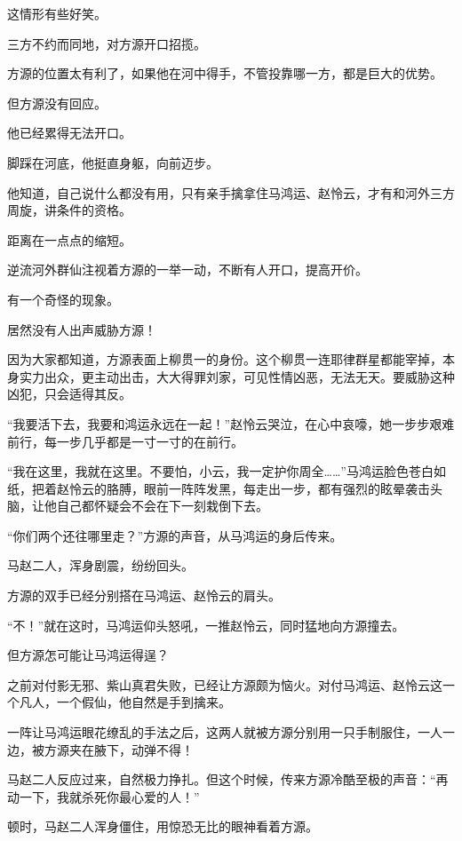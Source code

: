 
\begin{this_body}

这情形有些好笑。

三方不约而同地，对方源开口招揽。

方源的位置太有利了，如果他在河中得手，不管投靠哪一方，都是巨大的优势。

但方源没有回应。

他已经累得无法开口。

脚踩在河底，他挺直身躯，向前迈步。

他知道，自己说什么都没有用，只有亲手擒拿住马鸿运、赵怜云，才有和河外三方周旋，讲条件的资格。

距离在一点点的缩短。

逆流河外群仙注视着方源的一举一动，不断有人开口，提高开价。

有一个奇怪的现象。

居然没有人出声威胁方源！

因为大家都知道，方源表面上柳贯一的身份。这个柳贯一连耶律群星都能宰掉，本身实力出众，更主动出击，大大得罪刘家，可见性情凶恶，无法无天。要威胁这种凶犯，只会适得其反。

“我要活下去，我要和鸿运永远在一起！”赵怜云哭泣，在心中哀嚎，她一步步艰难前行，每一步几乎都是一寸一寸的在前行。

“我在这里，我就在这里。不要怕，小云，我一定护你周全……”马鸿运脸色苍白如纸，把着赵怜云的胳膊，眼前一阵阵发黑，每走出一步，都有强烈的眩晕袭击头脑，让他自己都怀疑会不会在下一刻栽倒下去。

“你们两个还往哪里走？”方源的声音，从马鸿运的身后传来。

马赵二人，浑身剧震，纷纷回头。

方源的双手已经分别搭在马鸿运、赵怜云的肩头。

“不！”就在这时，马鸿运仰头怒吼，一推赵怜云，同时猛地向方源撞去。

但方源怎可能让马鸿运得逞？

之前对付影无邪、紫山真君失败，已经让方源颇为恼火。对付马鸿运、赵怜云这一个凡人，一个假仙，他自然是手到擒来。

一阵让马鸿运眼花缭乱的手法之后，这两人就被方源分别用一只手制服住，一人一边，被方源夹在腋下，动弹不得！

马赵二人反应过来，自然极力挣扎。但这个时候，传来方源冷酷至极的声音：“再动一下，我就杀死你最心爱的人！”

顿时，马赵二人浑身僵住，用惊恐无比的眼神看着方源。


\end{this_body}
